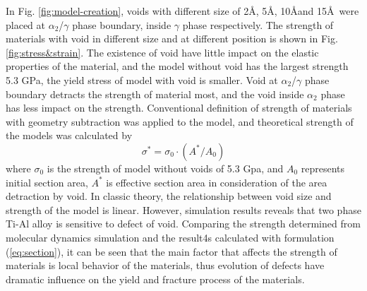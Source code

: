 \documentclass[Unknown,article,submit,moreauthors,pdftex,10pt,a4paper]{Definitions/mdpi}
\begin{document}
In Fig. \ref{fig:model-creation}, voids with different size of 2\AA, 5\AA, 10\AA and 15\AA\ were placed  at $\alpha_2$/$\gamma$ phase boundary, inside $\gamma$ phase respectively. The strength of materials with void in different size and at different position is shown in Fig.\ref{fig:stress&strain}. The existence of void have little impact on the elastic properties of the material, and the model without void has the largest strength 5.3 GPa, the yield stress of model with void is smaller. Void at $\alpha_2$/$\gamma$ phase boundary detracts the strength of material most, and the void inside $\alpha_2$ phase has less impact on the strength.          
Conventional definition of strength of materials with geometry subtraction was applied to the model, and theoretical strength of the models was calculated by
\begin{equation} \label{eq:section} 
\sigma^* = \sigma_0 \cdot({A^*}/{A_0})
\end{equation}
where $\sigma_0$ is the strength of model without voids of 5.3 Gpa, and $A_0$ represents initial section area,  $A^*$ is effective section area in consideration of the area detraction by void.  In classic theory, the relationship between void size and strength of the model is linear. However, simulation results reveals that two phase Ti-Al alloy is sensitive to defect of void.  Comparing the strength determined from molecular dynamics simulation and the result4s calculated with formulation (\ref{eq:section}), it can be seen that the main factor that affects the strength of materials is local behavior of the materials, thus evolution of defects have dramatic influence on the yield and fracture process of the materials.
\end{document}

